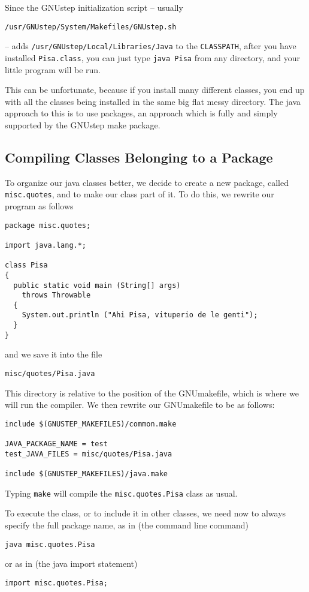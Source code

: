 Since the GNUstep initialization script -- usually 
\begin{verbatim}
/usr/GNUstep/System/Makefiles/GNUstep.sh
\end{verbatim}
-- adds \texttt{/usr/GNUstep/Local/Libraries/Java} to the
\texttt{CLASSPATH}, after you have installed \texttt{Pisa.class}, you
can just type
\texttt{java Pisa} from any directory, and your little program will be run.

This can be unfortunate, because if you install many different
classes, you end up with all the classes being installed in the same
big flat messy directory.  The java approach to this is to use
packages, an approach which is fully and simply supported by the
GNUstep make package.

\subsection{Compiling Classes Belonging to a Package}

To organize our java classes better, we decide to create a new
package, called \texttt{misc.quotes}, and to make our class part of
it.  To do this, we rewrite our program as follows
\begin{verbatim}
package misc.quotes;

import java.lang.*;

class Pisa
{ 
  public static void main (String[] args) 
    throws Throwable
  {
    System.out.println ("Ahi Pisa, vituperio de le genti");
  }
}
\end{verbatim}
and we save it into the file 
\begin{verbatim}
misc/quotes/Pisa.java
\end{verbatim}
This directory is relative to the position of the GNUmakefile, which
is where we will run the compiler.  We then rewrite our GNUmakefile to
be as follows:
\begin{verbatim}
include $(GNUSTEP_MAKEFILES)/common.make

JAVA_PACKAGE_NAME = test
test_JAVA_FILES = misc/quotes/Pisa.java

include $(GNUSTEP_MAKEFILES)/java.make
\end{verbatim}
Typing \texttt{make} will compile the \texttt{misc.quotes.Pisa} class
as usual.

To execute the class, or to include it in other classes, we need now 
to always specify the full package name, as in (the command line command) 
\begin{verbatim}
java misc.quotes.Pisa
\end{verbatim}
or as in (the java import statement)
\begin{verbatim}
import misc.quotes.Pisa;
\end{verbatim}


